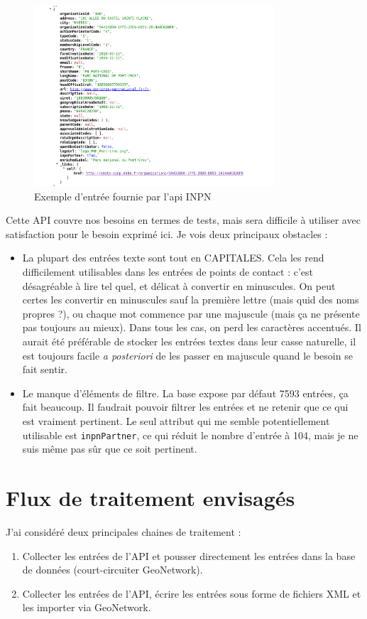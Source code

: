 \documentclass[11pt, a4paper, oneside]{book}
\newcommand{\gn}{GeoNetwork\xspace}
\begin{document}
\begin{figure}[hbtp]
	\centering
	\includegraphics[width=0.8\textwidth]{includes/poc_inpn.png}
	\caption{Exemple d'entrée fournie par l'api INPN}
\end{figure}

Cette API couvre nos besoins en termes de tests, mais sera difficile à utiliser avec satisfaction pour le besoin exprimé ici. Je vois deux principaux obstacles :

\begin{itemize}
	\item La plupart des entrées texte sont tout en CAPITALES. Cela les rend difficilement utilisables dans les entrées de points de contact : c'est désagréable à lire tel quel, et délicat à convertir en minuscules. On peut certes les convertir en minuscules sauf la première lettre (mais quid des noms propres ?), ou chaque mot commence par une majuscule (mais ça ne présente pas toujours au mieux). Dans tous les cas, on perd les caractères accentués. Il aurait été préférable de stocker les entrées textes dans leur casse naturelle, il est toujours facile \textit{a posteriori} de les passer en majuscule quand le besoin se fait sentir.
	\item Le manque d'éléments de filtre. La base expose par défaut 7593 entrées, ça fait beaucoup. Il faudrait pouvoir filtrer les entrées et ne retenir que ce qui est vraiment pertinent. Le seul attribut qui me semble potentiellement utilisable est \texttt{inpnPartner}, ce qui réduit le nombre d'entrée à 104, mais je ne suis même pas sûr que ce soit pertinent.
\end{itemize}

\section*{Flux de traitement envisagés}
J'ai considéré deux principales chaines de traitement : 
\begin{enumerate}
	\item Collecter les entrées de l'API et pousser directement les entrées dans la base de données (court-circuiter \gn).
	\item Collecter les entrées de l'API, écrire les entrées sous forme de fichiers XML et les importer via \gn.
\end{enumerate}
\end{document}
